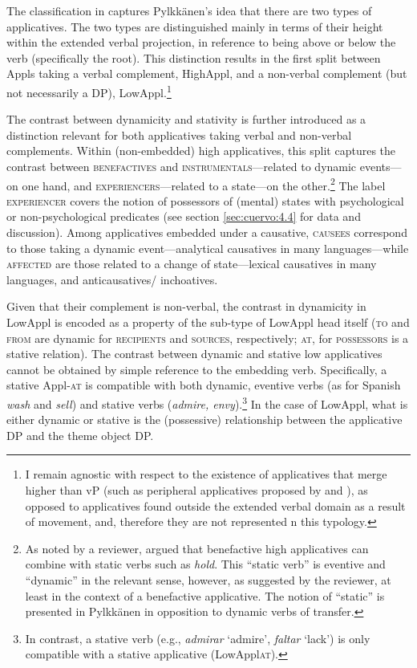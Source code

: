 \documentclass[output=paper,colorlinks,citecolor=brown,nonflat]{./langscibook}
\begin{document}
The classification in  captures Pylkkänen’s idea that there are two types of applicatives. The two types are distinguished mainly in terms of their height within the extended verbal projection, in reference to being above or below the verb (specifically the root). This distinction results in the first split between Appls taking a verbal complement, HighAppl, and a non-verbal complement (but not necessarily a DP), LowAppl.\footnote{I remain agnostic with respect to the existence of applicatives that merge higher than vP (such as peripheral applicatives proposed by \citealt{Kim2011high} and \citealt{Tsai2018}), as opposed to applicatives found outside the extended verbal domain as a result of movement, and, therefore they are not represented n this typology.} 

The contrast between dynamicity and stativity is further introduced as a distinction relevant for both applicatives taking verbal and non-verbal complements. Within (non-embedded) high applicatives, this split captures the contrast between \textsc{benefactives} and \textsc{instrumentals}—related to dynamic events—on one hand, and \textsc{experiencers}—related to a state—on the other.\footnote{As noted by a reviewer, \citet{Pylkkänen2008} argued that benefactive high applicatives can combine with static verbs such as \textit{hold}. This “static verb” is eventive and “dynamic” in the relevant sense, however, as suggested by the reviewer, at least in the context of a benefactive applicative. The notion of “static” is presented in Pylkkänen in opposition to dynamic verbs of transfer.} The label \textsc{experiencer} covers the notion of possessors of (mental) states with psychological or non-psychological predicates (see section \ref{sec:cuervo:4.4} for data and discussion). Among applicatives embedded under a causative, \textsc{causees} correspond to those taking a dynamic event—analytical causatives in many languages—while \textsc{affected} are those related to a change of state—lexical causatives in many languages, and anticausatives/ inchoatives. 

Given that their complement is non-verbal, the contrast in dynamicity in LowAppl is encoded as a property of the sub-type of LowAppl head itself (\textsc{to} and \textsc{from} are dynamic for \textsc{recipients} and \textsc{sources}, respectively; \textsc{at}, for \textsc{possessors} is a stative relation). The contrast between dynamic and stative low applicatives cannot be obtained by simple reference to the embedding verb. Specifically, a stative Appl-\textsc{at} is compatible with both dynamic, eventive verbs (as for Spanish \textit{wash} and \textit{sell}) and stative verbs (\textit{admire, envy}).\footnote{In contrast, a stative verb (e.g., \textit{admirar} ‘admire’, \textit{faltar} ‘lack’) is only compatible with a stative applicative (LowAppl\textsc{at}).}  In the case of LowAppl, what is either dynamic or stative is the (possessive) relationship between the applicative DP and the theme object DP. 
\end{document}
